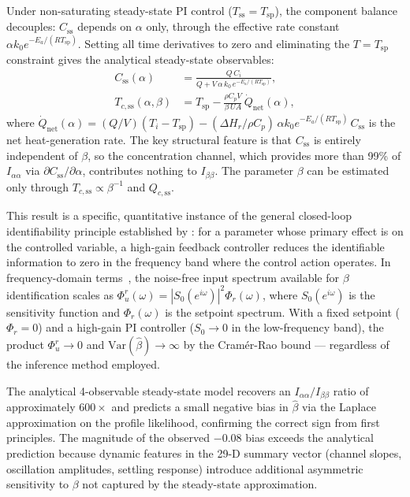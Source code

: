 \documentclass[aps,pre,twocolumn,superscriptaddress]{revtex4-2}
\begin{document}

Under non-saturating steady-state PI control ($T_\mathrm{ss} = T_\mathrm{sp}$),
the component balance decouples: $C_\mathrm{ss}$ depends on $\alpha$ only,
through the effective rate constant $\alpha k_0 e^{-E_a/(RT_\mathrm{sp})}$.
Setting all time derivatives to zero and eliminating the $T = T_\mathrm{sp}$
constraint gives the analytical steady-state observables:
%
\begin{align}
  C_\mathrm{ss}(\alpha)
    &= \frac{Q\,C_i}{Q + V\,\alpha\,k_0\,e^{-E_a/(RT_\mathrm{sp})}},
  \label{eq:css_anal} \\[4pt]
  T_{c,\mathrm{ss}}(\alpha,\beta)
    &= T_\mathrm{sp}
       - \frac{\rho C_p V}{\beta\,U\!A}\,\dot{Q}_\mathrm{net}(\alpha),
  \label{eq:tcss_anal}
\end{align}
%
where $\dot{Q}_\mathrm{net}(\alpha) = (Q/V)(T_i - T_\mathrm{sp})
- (\Delta H_r/\rho C_p)\,\alpha k_0 e^{-E_a/(RT_\mathrm{sp})}\,C_\mathrm{ss}$
is the net heat-generation rate. The key structural feature is that $C_\mathrm{ss}$
is entirely independent of $\beta$, so the concentration channel, which
provides more than 99\% of $I_{\alpha\alpha}$ via $\partial C_\mathrm{ss}/\partial\alpha$, contributes nothing to $I_{\beta\beta}$. The parameter $\beta$ can be estimated only through $T_{c,\mathrm{ss}} \propto \beta^{-1}$ and $Q_{c,\mathrm{ss}}$.

This result is a specific, quantitative instance of the general
closed-loop identifiability principle established by
\citet{Gustavsson1977}: for a parameter whose primary effect is on the
controlled variable, a high-gain feedback controller reduces the
identifiable information to zero in the frequency band where the control
action operates.  In frequency-domain terms~\citep{Forssell1999}, the
noise-free input spectrum available for $\beta$ identification scales as
$\Phi_u^r(\omega) = |S_0(e^{i\omega})|^2 \Phi_r(\omega)$, where
$S_0(e^{i\omega})$ is the sensitivity function and $\Phi_r(\omega)$ is the
setpoint spectrum.  With a fixed setpoint ($\Phi_r = 0$) and a high-gain
PI controller ($S_0 \to 0$ in the low-frequency band), the product
$\Phi_u^r \to 0$ and $\mathrm{Var}(\hat\beta) \to \infty$ by the
Cramér-Rao bound --- regardless of the inference method employed.

The analytical 4-observable steady-state model recovers an $I_{\alpha\alpha}/I_{\beta\beta}$ ratio of approximately $600\times$ and predicts a small negative bias in $\hat\beta$ via the Laplace approximation on the profile likelihood, confirming the correct
sign from first principles.  The magnitude of the observed $-0.08$ bias exceeds the analytical prediction because dynamic features in the 29-D summary vector
(channel slopes, oscillation amplitudes, settling response) introduce additional
asymmetric sensitivity to $\beta$ not captured by the steady-state approximation.
\end{document}

